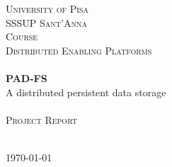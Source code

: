 \begin{titlepage}
  \begin{center}

    \textsc{\LARGE University of Pisa}\\[0.5cm]
    \textsc{\LARGE SSSUP Sant'Anna}\\[2cm]

    \textsc{Course}\\[0.5cm]
    \textsc{\Large Distributed Enabling Platforms}\\[2.5cm]

    \HRule\\[0.4cm]
    {\huge \bfseries PAD-FS}\\[0.4cm]
    {\huge A distributed persistent data storage}\\[0.4cm]
    \HRule\\[3cm]
    \textsc{Project Report}\\[0.4cm]

    \noindent{}\\[1cm]


    \vfill

    {\large \today}

  \end{center}
\end{titlepage}
